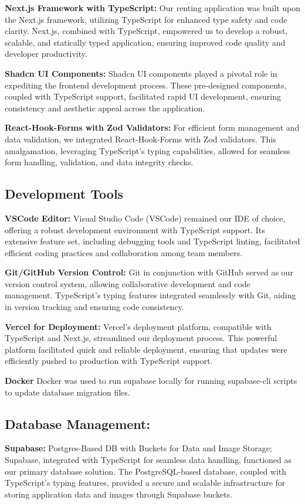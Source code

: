 \textbf{Next.js Framework with TypeScript:}
Our renting application was built upon the Next.js framework, utilizing TypeScript for enhanced type safety and code clarity. Next.js, combined with TypeScript, empowered us to develop a robust, scalable, and statically typed application, ensuring improved code quality and developer productivity.

\medskip\noindent
\textbf{Shadcn UI Components:}
Shadcn UI components played a pivotal role in expediting the frontend development process. These pre-designed components, coupled with TypeScript support, facilitated rapid UI development, ensuring consistency and aesthetic appeal across the application.

\medskip\noindent
\textbf{React-Hook-Forms with Zod Validators:}
For efficient form management and data validation, we integrated React-Hook-Forms with Zod validators. This amalgamation, leveraging TypeScript's typing capabilities, allowed for seamless form handling, validation, and data integrity checks.

\subsection{Development Tools}
\textbf{VSCode Editor:}
Visual Studio Code (VSCode) remained our IDE of choice, offering a robust development environment with TypeScript support. Its extensive feature set, including debugging tools and TypeScript linting, facilitated efficient coding practices and collaboration among team members.

\medskip\noindent
\textbf{Git/GitHub Version Control:}
Git in conjunction with GitHub served as our version control system, allowing collaborative development and code management. TypeScript's typing features integrated seamlessly with Git, aiding in version tracking and ensuring code consistency.

\medskip\noindent
\textbf{Vercel for Deployment:}
Vercel's deployment platform, compatible with TypeScript and Next.js, streamlined our deployment process. This powerful platform facilitated quick and reliable deployment, ensuring that updates were efficiently pushed to production with TypeScript support.

\medskip\noindent
\textbf{Docker}
Docker was used to run supabase locally for running supabase-cli scripts to update database migration files.

\subsection{Database Management:}
\textbf{Supabase:}
Postgres-Based DB with Buckets for Data and Image Storage;
Supabase, integrated with TypeScript for seamless data handling, functioned as our primary database solution. The PostgreSQL-based database, coupled with TypeScript's typing features, provided a secure and scalable infrastructure for storing application data and images through Supabase buckets.

